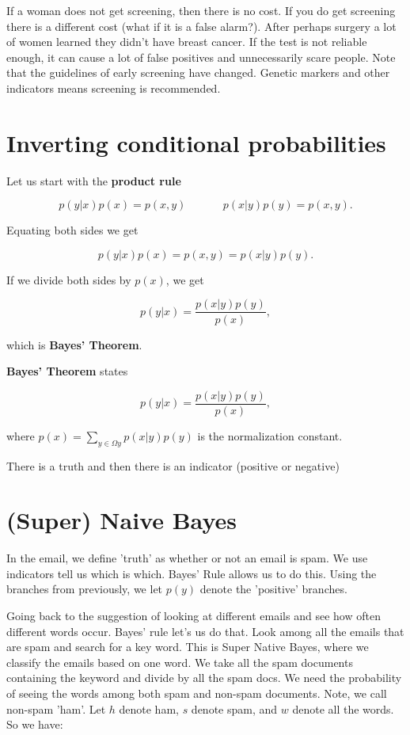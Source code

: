 If a woman does not get screening, then there is no cost. If you do get screening there is a different cost (what if it is a false alarm?). After perhaps surgery a lot of women learned they didn't have breast cancer. If the test is not reliable enough, it can cause a lot of false positives and unnecessarily scare people. Note that the guidelines of early screening have changed. Genetic markers and other indicators means screening is recommended.

\section{Inverting conditional probabilities}

Let us start with the \textbf{product rule}

$$p(y | x) p(x) = p(x, y) ~~~~~~~~~~~~~~~ p(x | y) p(y) = p(x, y).$$

Equating both sides we get

$$p(y | x) p(x) = p(x, y) = p(x | y) p(y).$$

If we divide both sides by $p(x)$, we get

$$p(y | x) = \frac{p(x | y) p(y)}{p(x)},$$

which is \textbf{Bayes' Theorem}.

\textbf{Bayes' Theorem} states 

$$p(y | x) = \frac{p(x | y) p(y)}{p(x)},$$

where $p(x) = \sum_{y \in \Omega y} p(x | y) p(y)$ is the normalization constant. 

There is a truth and then there is an indicator (positive or negative)

\section{(Super) Naive Bayes}

In the email, we define 'truth' as whether or not an email is spam. We use indicators tell us which is which. Bayes' Rule allows us to do this. Using the branches from previously, we let $p(y)$ denote the 'positive' branches.

Going back to the suggestion of looking at different emails and see how often different words occur. Bayes' rule let's us do that. Look among all the emails that are spam and search for a key word. This is Super Native Bayes, where we classify the emails based on one word. We take all the spam documents containing the keyword and divide by all the spam docs. We need the probability of seeing the words among both spam and non-spam documents. Note, we call non-spam 'ham'. Let $h$ denote ham, $s$ denote spam, and $w$ denote all the words. So we have:

